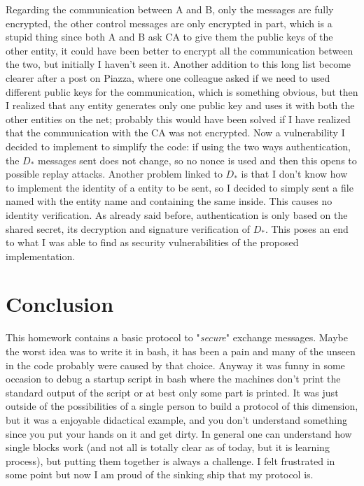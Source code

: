 \documentclass{article}
\begin{document}
Regarding the communication between A and B, only the messages are fully encrypted, the other control messages are only encrypted in part, which is a stupid thing since both A and B ask CA to give them the public keys of the other entity, it could have been better to encrypt all the communication between the two, but initially I haven't seen it.\newline
Another addition to this long list become clearer after a post on Piazza, where one colleague asked if we need to used different public keys for the communication, which is something obvious, but then I realized that any entity generates only one public key and uses it with both the other entities on the net; probably this would have been solved if I have realized that the communication with the CA was not encrypted.\newline
Now a vulnerability I decided to implement to simplify the code: if using the two ways authentication, the $D_*$ messages sent does not change, so no nonce is used and then this opens to possible replay attacks. Another problem linked to $D_*$ is that I don't know how to implement the identity of a entity to be sent, so I decided to simply sent a file named with the entity name and containing the same inside. This causes no identity verification. As already said before, authentication is only based on the shared secret, its decryption and signature verification of $D_*$.\newline
This poses an end to what I was able to find as security vulnerabilities of the proposed implementation.


\section{Conclusion}

This homework contains a basic protocol to "\textit{secure}" exchange messages. Maybe the worst idea was to write it in bash, it has been a pain and many of the unseen in the code probably were caused by that choice. Anyway it was funny in some occasion to debug a startup script in bash where the machines don't print the standard output of the script or at best only some part is printed. It was just outside of the possibilities of a single person to build a protocol of this dimension, but it was a enjoyable didactical example, and you don't understand something since you put your hands on it and get dirty. In general one can understand how single blocks work (and not all is totally clear as of today, but it is learning process), but putting them together is always a challenge. I felt frustrated in some point but now I am proud of the sinking ship that my protocol is.
\end{document}
